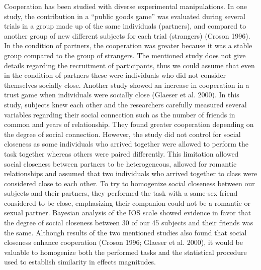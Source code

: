 \documentclass[smallextended]{svjour3}       %
\begin{document}
Cooperation has been studied with diverse experimental manipulations. In
one study, the contribution in a ``public goods game'' was evaluated
during several trials in a group made up of the same individuals
(partners), and compared to another group of new different subjects for
each trial (strangers) (Croson 1996). In the condition of partners, the
cooperation was greater because it was a stable group compared to the
group of strangers. The mentioned study does not give details regarding
the recruitment of participants, thus we could assume that even in the
condition of partners these were individuals who did not consider
themselves socially close. Another study showed an increase in
cooperation in a trust game when individuals were socially close
(Glaeser et al. 2000). In this study, subjects knew each other and the
researchers carefully measured several variables regarding their social
connection such as the number of friends in common and years of
relationship. They found greater cooperation depending on the degree of
social connection. However, the study did not control for social
closeness as some individuals who arrived together were allowed to
perform the task together whereas others were paired differently. This
limitation allowed social closeness between partners to be
heterogeneous, allowed for romantic relationships and assumed that two
individuals who arrived together to class were considered close to each
other. To try to homogenize social closeness between our subjects and
their partners, they performed the task with a same-sex friend
considered to be close, emphasizing their companion could not be a
romantic or sexual partner. Bayesian analysis of the IOS scale showed
evidence in favor that the degree of social closeness between 30 of our
45 subjects and their friends was the same. Although results of the two
mentioned studies also found that social closeness enhance cooperation
(Croson 1996; Glaeser et al. 2000), it would be valuable to homogenize
both the performed tasks and the statistical procedure used to establish
similarity in effects magnitudes.
\end{document}
